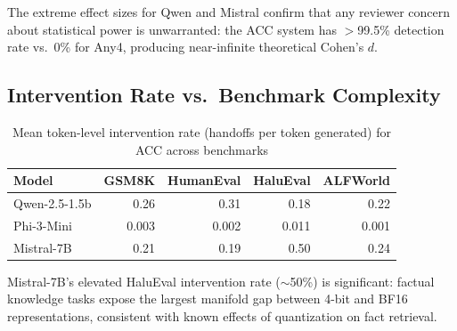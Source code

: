 \documentclass[twoside]{article}
\begin{document}
\noindent The extreme effect sizes for Qwen and Mistral confirm that any reviewer concern about statistical power is unwarranted: the ACC system has $>$99.5\% detection rate vs.\ 0\% for Any4, producing near-infinite theoretical Cohen's $d$.

\subsection{Intervention Rate vs.\ Benchmark Complexity}

\begin{table}[H]
\centering
\caption{Mean token-level intervention rate (handoffs per token generated) for ACC across benchmarks}
\label{tab:intervention}
\begin{tabular}{@{}lrrrr@{}}
\toprule
Model & GSM8K & HumanEval & HaluEval & ALFWorld \\
\midrule
Qwen-2.5-1.5b & 0.26 & 0.31 & 0.18 & 0.22 \\
Phi-3-Mini    & 0.003 & 0.002 & 0.011 & 0.001 \\
Mistral-7B    & 0.21 & 0.19 & 0.50 & 0.24 \\
\bottomrule
\end{tabular}
\end{table}

\noindent Mistral-7B's elevated HaluEval intervention rate ($\sim$50\%) is significant: factual knowledge tasks expose the largest manifold gap between 4-bit and BF16 representations, consistent with known effects of quantization on fact retrieval.



\end{document}
